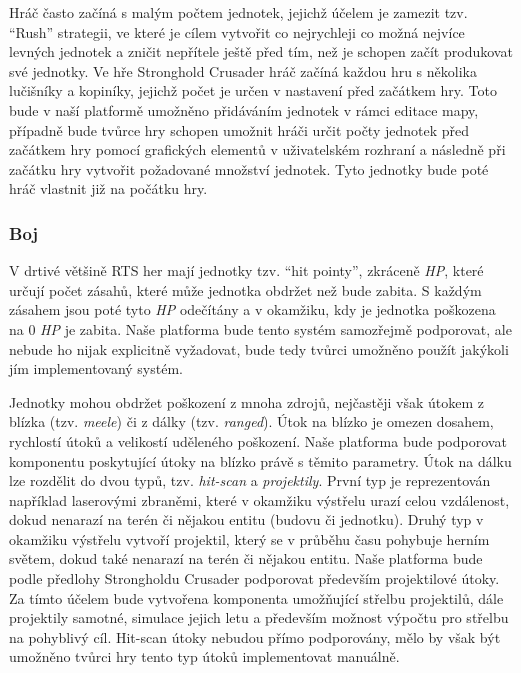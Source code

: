 Hráč často začíná s malým počtem jednotek, jejichž účelem je zamezit tzv. ``Rush'' strategii, ve které je cílem vytvořit co nejrychleji co možná nejvíce levných jednotek a zničit nepřítele ještě před tím, než je schopen začít produkovat své jednotky. Ve hře Stronghold Crusader hráč začíná každou hru s několika lučišníky a kopiníky, jejichž počet je určen v nastavení před začátkem hry. Toto bude v naší platformě umožněno přidáváním jednotek v rámci editace mapy, případně bude tvůrce hry schopen umožnit hráči určit počty jednotek před začátkem hry pomocí grafických elementů v uživatelském rozhraní a následně při začátku hry vytvořit požadované množství jednotek. Tyto jednotky bude poté hráč vlastnit již na počátku hry.

\subsubsection{Boj}

V drtivé většině RTS her mají jednotky tzv. ``hit pointy'', zkráceně \textit{HP}, které určují počet zásahů, které může jednotka obdržet než bude zabita. S každým zásahem jsou poté tyto \textit{HP} odečítány a v okamžiku, kdy je jednotka poškozena na 0 \textit{HP} je zabita. Naše platforma bude tento systém samozřejmě podporovat, ale nebude ho nijak explicitně vyžadovat, bude tedy tvůrci umožněno použít jakýkoli jím implementovaný systém. 

Jednotky mohou obdržet poškození z mnoha zdrojů, nejčastěji však útokem z blízka (tzv. \textit{meele}) či z dálky (tzv. \textit{ranged}). Útok na blízko je omezen dosahem, rychlostí útoků a velikostí uděleného poškození. Naše platforma bude podporovat komponentu poskytující útoky na blízko právě s těmito parametry. Útok na dálku lze rozdělit do dvou typů, tzv. \textit{hit-scan} a \textit{projektily}. První typ je reprezentován například laserovými zbraněmi, které v okamžiku výstřelu urazí celou vzdálenost, dokud nenarazí na terén či nějakou entitu (budovu či jednotku). Druhý typ v okamžiku výstřelu vytvoří projektil, který se v průběhu času pohybuje herním světem, dokud také nenarazí na terén či nějakou entitu. Naše platforma bude podle předlohy Strongholdu Crusader podporovat především projektilové útoky. Za tímto účelem bude vytvořena komponenta umožňující střelbu projektilů, dále projektily samotné, simulace jejich letu a především možnost výpočtu pro střelbu na pohyblivý cíl. Hit-scan útoky nebudou přímo podporovány, mělo by však být umožněno tvůrci hry tento typ útoků implementovat manuálně.

